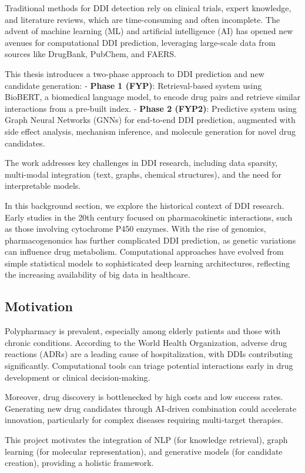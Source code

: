 \documentclass[12pt,a4paper]{article}
\begin{document}
Traditional methods for DDI detection rely on clinical trials, expert knowledge, and literature reviews, which are time-consuming and often incomplete. The advent of machine learning (ML) and artificial intelligence (AI) has opened new avenues for computational DDI prediction, leveraging large-scale data from sources like DrugBank, PubChem, and FAERS.

This thesis introduces a two-phase approach to DDI prediction and new candidate generation:
- \textbf{Phase 1 (FYP)}: Retrieval-based system using BioBERT, a biomedical language model, to encode drug pairs and retrieve similar interactions from a pre-built index.
- \textbf{Phase 2 (FYP2)}: Predictive system using Graph Neural Networks (GNNs) for end-to-end DDI prediction, augmented with side effect analysis, mechanism inference, and molecule generation for novel drug candidates.

The work addresses key challenges in DDI research, including data sparsity, multi-modal integration (text, graphs, chemical structures), and the need for interpretable models.

In this background section, we explore the historical context of DDI research. Early studies in the 20th century focused on pharmacokinetic interactions, such as those involving cytochrome P450 enzymes. With the rise of genomics, pharmacogenomics has further complicated DDI prediction, as genetic variations can influence drug metabolism. Computational approaches have evolved from simple statistical models to sophisticated deep learning architectures, reflecting the increasing availability of big data in healthcare.

\subsection{Motivation}
Polypharmacy is prevalent, especially among elderly patients and those with chronic conditions. According to the World Health Organization, adverse drug reactions (ADRs) are a leading cause of hospitalization, with DDIs contributing significantly. Computational tools can triage potential interactions early in drug development or clinical decision-making.

Moreover, drug discovery is bottlenecked by high costs and low success rates. Generating new drug candidates through AI-driven combination could accelerate innovation, particularly for complex diseases requiring multi-target therapies.

This project motivates the integration of NLP (for knowledge retrieval), graph learning (for molecular representation), and generative models (for candidate creation), providing a holistic framework.
\end{document}
